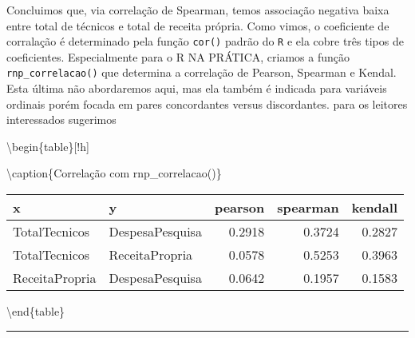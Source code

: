 \documentclass[11pt,]{style/krantz}
\makeatletter
\newenvironment{Shaded}{\begin{snugshade}}{\end{snugshade}}
\newcommand{\DataTypeTok}[1]{\textcolor[rgb]{0.13,0.29,0.53}{#1}}
\newcommand{\KeywordTok}[1]{\textcolor[rgb]{0.13,0.29,0.53}{\textbf{#1}}}
\newcommand{\NormalTok}[1]{#1}
\newcommand{\OperatorTok}[1]{\textcolor[rgb]{0.81,0.36,0.00}{\textbf{#1}}}
\newcommand{\OtherTok}[1]{\textcolor[rgb]{0.56,0.35,0.01}{#1}}
\newcommand{\StringTok}[1]{\textcolor[rgb]{0.31,0.60,0.02}{#1}}
\newenvironment{kframe}{%
\medskip{}
\setlength{\fboxsep}{.8em}
 \def\at@end@of@kframe{}%
 \ifinner\ifhmode%
  \def\at@end@of@kframe{\end{minipage}}%
  \begin{minipage}{\columnwidth}%
 \fi\fi%
 \def\FrameCommand##1{\hskip\@totalleftmargin \hskip-\fboxsep
 \colorbox{shadecolor}{##1}\hskip-\fboxsep
     \hskip-\linewidth \hskip-\@totalleftmargin \hskip\columnwidth}%
 \MakeFramed {\advance\hsize-\width
   \@totalleftmargin\z@ \linewidth\hsize
   \@setminipage}}%
 {\par\unskip\endMakeFramed%
 \at@end@of@kframe}
\renewenvironment{Shaded}{\begin{kframe}}{\end{kframe}}
\theoremstyle{definition}
\theoremstyle{definition}
\theoremstyle{definition}
\theoremstyle{remark}
\makeatother
\begin{document}
Concluimos que, via correlação de Spearman, temos associação negativa baixa entre total de técnicos e total de receita própria. Como vimos, o coeficiente de corralação é determinado pela função \texttt{cor()} padrão do \texttt{R} e ela cobre três tipos de coeficientes. Especialmente para o R NA PRÁTICA, criamos a função \texttt{rnp\_correlacao()} que determina a correlação de Pearson, Spearman e Kendal. Esta última não abordaremos aqui, mas ela também é indicada para variáveis ordinais porém focada em pares concordantes versus discordantes. para os leitores interessados sugerimos \citep{kendall1938new}

\begin{Shaded}
\end{Shaded}

\textbackslash{}begin\{table\}{[}!h{]}

\textbackslash{}caption\{\label{tab:unnamed-chunk-108}Correlação com rnp\_correlacao()\}
\centering

\begin{tabular}{llrrr}
\toprule
x & y & pearson & spearman & kendall\\
\midrule
TotalTecnicos & DespesaPesquisa & 0.2918 & 0.3724 & 0.2827\\
TotalTecnicos & ReceitaPropria & 0.0578 & 0.5253 & 0.3963\\
ReceitaPropria & DespesaPesquisa & 0.0642 & 0.1957 & 0.1583\\
\bottomrule
\end{tabular}

\textbackslash{}end\{table\}

\begin{center}\rule{0.5\linewidth}{\linethickness}\end{center}

\cleardoublepage

\hypertarget{appendix-apendice}{%
\appendix {}}




\backmatter
\printindex
\end{document}
